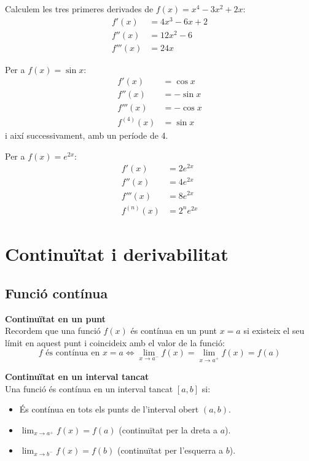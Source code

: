 \documentclass[12pt]{article}
\begin{document}
\begin{exemple}
Calculem les tres primeres derivades de $f(x)=x^4-3x^2+2x$:
\begin{align*}
f'(x) &= 4x^3-6x+2 \\
f''(x) &= 12x^2-6 \\
f'''(x) &= 24x
\end{align*}
\end{exemple}

\begin{exemple}
Per a $f(x)=\sin x$:
\begin{align*}
f'(x) &= \cos x \\
f''(x) &= -\sin x \\
f'''(x) &= -\cos x \\
f^{(4)}(x) &= \sin x
\end{align*}
i així successivament, amb un període de 4.
\end{exemple}

\begin{exemple}
Per a $f(x)=e^{2x}$:
\begin{align*}
f'(x) &= 2e^{2x} \\
f''(x) &= 4e^{2x} \\
f'''(x) &= 8e^{2x} \\
f^{(n)}(x) &= 2^n e^{2x}
\end{align*}
\end{exemple}

\section{Continuïtat i derivabilitat}

\subsection{Funció contínua}

\begin{concept}
\textbf{Continuïtat en un punt}\\
Recordem que una funció $f(x)$ és contínua en un punt $x=a$ si existeix el seu límit en aquest punt i coincideix amb el valor de la funció:
\[
\boxed{f \text{ és contínua en } x=a \iff \lim_{x\to a^-} f(x) = \lim_{x\to a^+} f(x) = f(a)}
\]

\textbf{Continuïtat en un interval tancat}\\
Una funció és contínua en un interval tancat $[a,b]$ si:
\begin{itemize}
    \item És contínua en tots els punts de l'interval obert $(a,b)$.
    \item $\displaystyle \lim_{x\to a^+} f(x) = f(a)$ (continuïtat per la dreta a $a$).
    \item $\displaystyle \lim_{x\to b^-} f(x) = f(b)$ (continuïtat per l'esquerra a $b$).
\end{itemize}
\end{concept}
\end{document}
